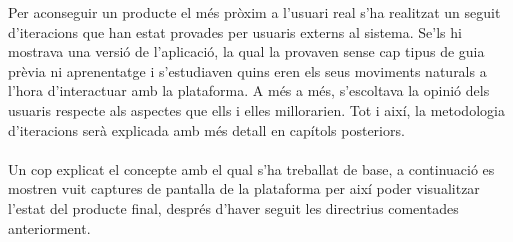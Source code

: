 Per aconseguir un producte el més pròxim a l'usuari real s'ha realitzat un seguit d'iteracions que han estat provades per usuaris externs al sistema. Se'ls hi mostrava una versió de l'aplicació, la qual la provaven sense cap tipus de guia prèvia ni aprenentatge i s'estudiaven quins eren els seus moviments naturals a l'hora d'interactuar amb la plataforma. A més a més, s'escoltava la opinió dels usuaris respecte als aspectes que ells i elles millorarien. Tot i així, la metodologia d'iteracions serà explicada amb més detall en capítols posteriors.
\\\\
Un cop explicat el concepte amb el qual s'ha treballat de base, a continuació es mostren vuit captures de pantalla de la plataforma per així poder visualitzar l'estat del producte final, després d'haver seguit les directrius comentades anteriorment.

